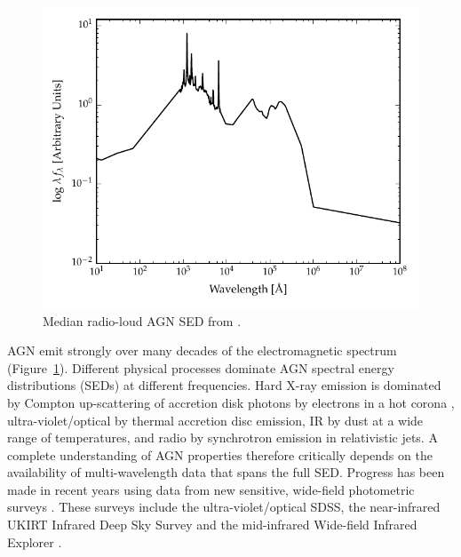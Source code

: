 \begin{figure}
  \centering
  \includegraphics[width=\textwidth]{figures/chapter05/shangsed.pdf}
  \caption{Median radio-loud AGN SED from \citet{shang11}.}
  \label{fig:seyfert_sed}
\end{figure}

AGN emit strongly over many decades of the electromagnetic spectrum (Figure~\ref{fig:seyfert_sed}). 
Different physical processes dominate AGN spectral energy distributions (SEDs) at different frequencies. 
Hard X-ray emission is dominated by Compton up-scattering of accretion disk photons by electrons in a hot corona \citep[e.g.][]{sunyaev80}, ultra-violet/optical by thermal accretion disc emission, IR by dust at a wide range of temperatures, and radio by synchrotron emission in relativistic jets.   
A complete understanding of AGN properties therefore critically depends on the availability of multi-wavelength data that spans the full SED. 
Progress has been made in recent years using data from new sensitive, wide-field photometric surveys \citep[e.g.][]{roseboom13}. 
These surveys include the ultra-violet/optical SDSS, the near-infrared UKIRT Infrared Deep Sky Survey \citep[UKIDSS;][]{lawrence07} and the mid-infrared Wide-field Infrared Explorer \citep[WISE;][]{wright10}. 

